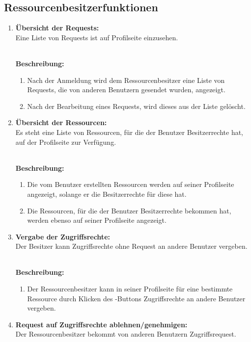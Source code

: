 \documentclass[parskip=full,11pt]{scrartcl}
\def\threedigits#1{%
  \ifnum#1<10 0\fi
  \ifnum#1<1 0\fi
  \number#1}
\begin{document}
\subsection{Ressourcenbesitzerfunktionen}
\begin{enumerate}[label={\textbf{/F\protect\threedigits{\theenumi}0/}}, leftmargin=*, resume]
\item \label{FARB1} \textbf{Übersicht der Requests:}\\
Eine Liste von Requests ist auf Profilseite einzusehen.\\\

\textbf{Beschreibung:}\\
\begin{enumerate}[label=(\arabic*), leftmargin=*]
\item Nach der Anmeldung wird dem Ressourcenbesitzer eine Liste von Requests, die von anderen Benutzern gesendet wurden, angezeigt.
\item Nach der Bearbeitung eines Requests, wird dieses aus der Liste gelöscht.  
\end{enumerate}
\item \label{FARB2} \textbf{Übersicht der Ressourcen:}\\
Es steht eine Liste von Ressourcen, für die der Benutzer Besitzerrechte hat,  auf der Profilseite zur Verfügung.\\\

\textbf{Beschreibung:}\\
\begin{enumerate}[label=(\arabic*), leftmargin=*]

\item Die vom Benutzer erstellten Ressourcen werden auf seiner Profilseite angezeigt, solange er die Besitzerrechte für diese hat.
\item Die Ressourcen, für die der Benutzer Besitzerrechte bekommen hat, werden ebenso auf seiner Profilseite angezeigt.  
\end{enumerate}


\item \label{FARB3} \textbf {Vergabe der Zugriffsrechte:}\\ 
Der Besitzer kann Zugriffsrechte ohne Request an andere Benutzer vergeben.\\\

\textbf{Beschreibung:}\\
\begin{enumerate}[label=(\arabic*), leftmargin=*]

\item Der Ressourcenbesitzer kann in seiner Profilseite für eine bestimmte Ressource durch Klicken des \grqq -Buttons Zugriffsrechte an andere Benutzer vergeben. %
\end{enumerate}
\item \label{FARB4} \textbf {Request auf Zugriffsrechte ablehnen/genehmigen:}\\ 
Der Ressourcenbesitzer bekommt von anderen Benutzern Zugriffsrequest. \\\\



\end{enumerate}
\end{document}
